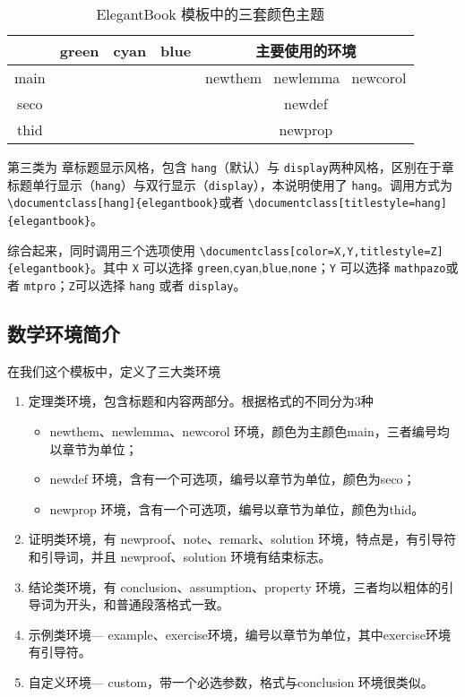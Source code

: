\begin{table}[htp]
\centering
\begin{tabular}{ccccc}
\toprule
	  & green & cyan & blue & 主要使用的环境\\
\midrule
main & \makecell{{\color{main1}\rule{1cm}{1cm}}}& \makecell{{\color{main2}\rule{1cm}{1cm}}}&\makecell{ {\color{main3}\rule{1cm}{1cm}}}& newthem \ newlemma \ newcorol\\

seco &\makecell{ {\color{seco1}\rule{1cm}{1cm}}}& \makecell{{\color{seco2}\rule{1cm}{1cm}}}&\makecell{ {\color{seco3}\rule{1cm}{1cm}}}&newdef\\

thid &\makecell{ {\color{thid1}\rule{1cm}{1cm}}}& \makecell{{\color{thid2}\rule{1cm}{1cm}}}&\makecell{ {\color{thid3}\rule{1cm}{1cm}}}&newprop\\
\bottomrule
\end{tabular}
\caption{ElegantBook 模板中的三套颜色主题\label{tab:color thm}}
\end{table}

第三类为{\color{main} 章标题显示风格}，包含 \verb|hang|（默认）与 \verb|display|两种风格，区别在于章标题单行显示（\verb|hang|）与双行显示（\verb|display|），本说明使用了 \verb|hang|。调用方式为 \verb|\documentclass[hang]{elegantbook}|或者 \verb|\documentclass[titlestyle=hang]{elegantbook}|。

综合起来，同时调用三个选项使用 \verb|\documentclass[color=X,Y,titlestyle=Z]{elegantbook}|。其中 \verb|X| 可以选择 \verb|green|,\verb|cyan|,\verb|blue|,\verb|none|；\verb|Y| 可以选择 \verb|mathpazo|或者 \verb|mtpro|；\verb|Z|可以选择 \verb|hang| 或者 \verb|display|。

\subsection{数学环境简介}
在我们这个模板中，定义了三大类环境
\begin{enumerate}
\item 定理类环境，包含标题和内容两部分。根据格式的不同分为3种
\begin{itemize}
\item {\color{main} newthem、newlemma、newcorol} 环境，颜色为主颜色main，三者编号均以章节为单位；
\item {\color{main} newdef} 环境，含有一个可选项，编号以章节为单位，颜色为seco；
\item {\color{main} newprop} 环境，含有一个可选项，编号以章节为单位，颜色为thid。
\end{itemize}
\item 证明类环境，有  {\color{main} newproof、note、remark、solution} 环境，特点是，有引导符和引导词，并且 newproof、solution 环境有结束标志。
\item 结论类环境，有 {\color{main}  conclusion、assumption、property} 环境，三者均以粗体的引导词为开头，和普通段落格式一致。
\item 示例类环境--- {\color{main} example、exercise}环境，编号以章节为单位，其中exercise环境有引导符。
\item 自定义环境--- {\color{main} custom}，带一个必选参数，格式与conclusion 环境很类似。
\end{enumerate}

